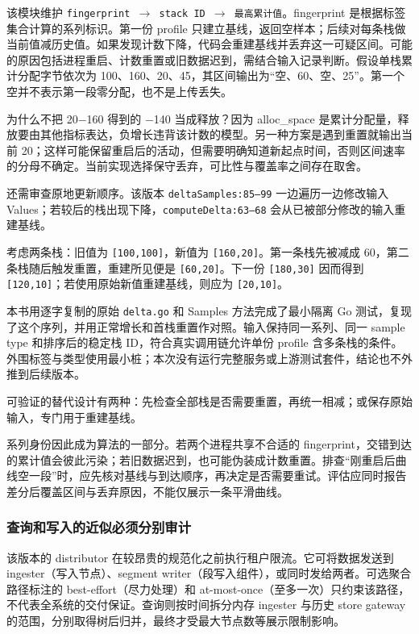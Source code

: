 \documentclass[UTF8,fontset=fandol,openany,11pt]{ctexbook}
\begin{document}
该模块维护 \texttt{fingerprint \ensuremath{\rightarrow}\allowbreak{} stack ID \ensuremath{\rightarrow}\allowbreak{} 最高累计值}。fingerprint 是根据标签集合计算的系列标识。第一份 profile 只建立基线，返回空样本；后续对每条栈做当前值减历史值。如果发现计数下降，代码会重建基线并丢弃这一可疑区间。可能的原因包括进程重启、计数重置或旧数据迟到，需结合输入记录判断。假设单栈累计分配字节依次为 100、160、20、45，其区间输出为“空、60、空、25”。第一个空并不表示第一段零分配，也不是上传丢失。

为什么不把 20\ensuremath{-}160 得到的 \ensuremath{-}140 当成释放？因为 alloc\_space 是累计分配量，释放要由其他指标表达，负增长违背该计数的模型。另一种方案是遇到重置就输出当前 20；这样可能保留重启后的活动，但需要明确知道新起点时间，否则区间速率的分母不确定。当前实现选择保守丢弃，可比性与覆盖率之间存在取舍。

还需审查原地更新顺序。该版本 \texttt{deltaSamples:\allowbreak{}85–99} 一边遍历一边修改输入 Values；若较后的栈出现下降，\texttt{computeDelta:\allowbreak{}63–68} 会从已被部分修改的输入重建基线。

考虑两条栈：旧值为 \texttt{[100,100]}，新值为 \texttt{[160,20]}。第一条栈先被减成 60，第二条栈随后触发重置，重建所见便是 \texttt{[60,20]}。下一份 \texttt{[180,30]} 因而得到 \texttt{[120,10]}；若使用原始新值重建基线，则应为 \texttt{[20,10]}。

本书用逐字复制的原始 \texttt{delta.\allowbreak{}go} 和 Samples 方法完成了最小隔离 Go 测试，复现了这个序列，并用正常增长和首栈重置作对照。输入保持同一系列、同一 sample type 和排序后的稳定栈 ID，符合真实调用链允许单份 profile 含多条栈的条件。外围标签与类型使用最小桩；本次没有运行完整服务或上游测试套件，结论也不外推到后续版本。

可验证的替代设计有两种：先检查全部栈是否需要重置，再统一相减；或保存原始输入，专门用于重建基线。\cite{proj-pyro-delta}

系列身份因此成为算法的一部分。若两个进程共享不合适的 fingerprint，交错到达的累计值会彼此污染；若旧数据迟到，也可能伪装成计数重置。排查“刚重启后曲线空一段”时，应先核对基线与到达顺序，再决定是否需要重试。评估应同时报告差分后覆盖区间与丢弃原因，不能仅展示一条平滑曲线。

\subsubsection{查询和写入的近似必须分别审计}
该版本的 distributor 在较昂贵的规范化之前执行租户限流。它可将数据发送到 ingester（写入节点）、segment writer（段写入组件），或同时发给两者。可选聚合路径标注的 best-effort（尽力处理）和 at-most-once（至多一次）只约束该路径，不代表全系统的交付保证。查询则按时间拆分内存 ingester 与历史 store gateway 的范围，分别取得树后归并，最终才受最大节点数等展示限制影响。\cite{proj-pyroscope} \cite{proj-pyroscope-store}
\end{document}
